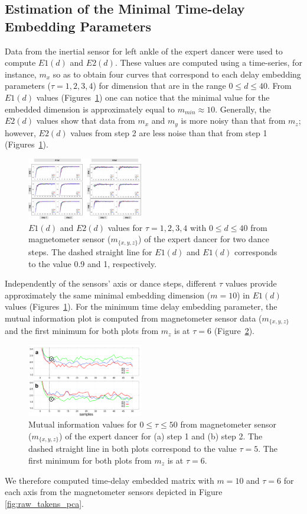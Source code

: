 \documentclass[10pt,journal,compsoc]{IEEEtran}
\begin{document}
\subsection{Estimation of the Minimal Time-delay Embedding Parameters}
Data from the inertial sensor for left ankle of the expert dancer were used to compute $E1(d)$ and $E2(d)$. 
These values are computed using a time-series, for instance, $m_x$
so as to obtain four curves that correspond to each delay embedding parameters ($\tau=1,2,3,4$)
for dimension that are in the range $0 \leq d \leq 40$.
From $E1(d)$ values (Figures~\ref{fig:e1e2}) one can notice that the minimal value 
for the embedded dimension is approximately equal to $m_{min} \approx 10$.
Generally, the $E2(d)$ values show that data from $m_x$ and $m_y$ is more noisy than that from $m_z$;
however, $E2(d)$ values from step 2 are less noise than that from step 1  (Figures~\ref{fig:e1e2}).
\begin{figure}[!htb]
\centering    
\includegraphics[width=0.45\textwidth]{e1e2_values_expert}
\caption[PA]{$E1(d)$ and $E2(d)$ values for $\tau=1,2,3,4$ with $0 \leq d \leq 40$
from magnetometer sensor ($m_{ \{ x,y,z \} }$) of the expert dancer for two dance steps.
The dashed straight line for $E1(d)$ and $E1(d)$ corresponds to the value 0.9 and 1, respectively.}
\label{fig:e1e2}
\end{figure}
Independently of the sensors' axis or dance steps, different $\tau$ values provide approximately the 
same minimal embedding dimension ($m=10$) in $E1(d)$ values (Figures~\ref{fig:e1e2}).
For the minimum time delay embedding parameter, the mutual information plot is computed
from magnetometer sensor data ($m_{ \{ x,y,z \} }$ and 
the first minimum for both plots from $m_z$ is at $\tau=6$ (Figure~\ref{fig:miplots}).
\begin{figure}[!htb]
\centering    
\includegraphics[width=0.45\textwidth]{miplots01}
\caption[PA]{
Mutual information values for $0 \leq \tau \leq 50$ from magnetometer sensor 
($m_{ \{ x,y,z \} }$) of the expert dancer for (a) step 1 and (b) step 2.
The dashed straight line in both plots correspond to the value $\tau=5$.
The first minimum for both plots from $m_z$ is at $\tau=6$.}
\label{fig:miplots}
\end{figure}
We therefore computed time-delay embedded matrix with $m=10$ and $\tau = 6$ 
for each axis from the magnetometer sensors depicted in Figure \ref{fig:raw_takens_pca}.
\end{document}
